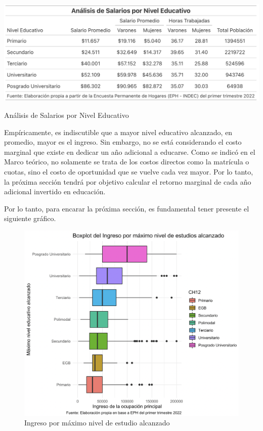 \documentclass[a4paper]{article}
\theoremstyle{plain}
\theoremstyle{definition}
\begin{document}
\begin{table}[h]
\label{tab:my table} 
\centering
    \includegraphics[scale=0.55]{figuras/analisis-salarios_mil.png}
    \caption{Análisis de Salarios por Nivel Educativo} 
\end{table}

Empíricamente, es indiscutible que a mayor nivel educativo alcanzado, en promedio, mayor es el ingreso. Sin embargo, no se está considerando el costo marginal que existe en dedicar un año adicional a educarse. Como se indicó en el Marco teórico, no solamente se trata de los costos directos como la matrícula o cuotas, sino el costo de oportunidad que se vuelve cada vez mayor. Por lo tanto, la próxima sección tendrá por objetivo calcular el retorno marginal de cada año adicional invertido en educación. 

Por lo tanto, para encarar la próxima sección, es fundamental tener presente el siguiente gráfico. 

\begin{figure}[h]
    \centering
    \includegraphics[scale=0.4]{figuras/CH12_boxplot.png}
    \caption{Ingreso por máximo nivel de estudio alcanzado}
    \label{fig:kernel_ingreso_genero_nivel_ed}
\end{figure}
\end{document}
